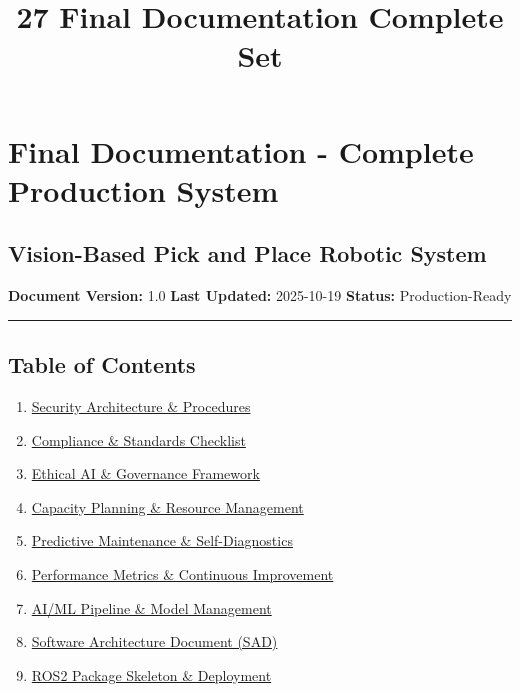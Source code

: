 \documentclass[
]{article}
\title{27 Final Documentation Complete Set}
\author{}
\date{}
\providecommand{\tightlist}{%
  \setlength{\itemsep}{0pt}\setlength{\parskip}{0pt}}
\begin{document}
\maketitle

{
\setcounter{tocdepth}{3}
\tableofcontents
}
\hypertarget{final-documentation---complete-production-system}{%
\section{Final Documentation - Complete Production
System}\label{final-documentation---complete-production-system}}

\hypertarget{vision-based-pick-and-place-robotic-system}{%
\subsection{Vision-Based Pick and Place Robotic
System}\label{vision-based-pick-and-place-robotic-system}}

\textbf{Document Version:} 1.0 \textbf{Last Updated:} 2025-10-19
\textbf{Status:} Production-Ready

\begin{center}\rule{0.5\linewidth}{0.5pt}\end{center}

\hypertarget{table-of-contents}{%
\subsection{Table of Contents}\label{table-of-contents}}

\begin{enumerate}
\def\labelenumi{\arabic{enumi}.}
\tightlist
\item
  \protect\hyperlink{security-architecture--procedures}{Security
  Architecture \& Procedures}
\item
  \protect\hyperlink{compliance--standards-checklist}{Compliance \&
  Standards Checklist}
\item
  \protect\hyperlink{ethical-ai--governance-framework}{Ethical AI \&
  Governance Framework}
\item
  \protect\hyperlink{capacity-planning--resource-management}{Capacity
  Planning \& Resource Management}
\item
  \protect\hyperlink{predictive-maintenance--self-diagnostics}{Predictive
  Maintenance \& Self-Diagnostics}
\item
  \protect\hyperlink{performance-metrics--continuous-improvement}{Performance
  Metrics \& Continuous Improvement}
\item
  \protect\hyperlink{aiml-pipeline--model-management}{AI/ML Pipeline \&
  Model Management}
\item
  \protect\hyperlink{software-architecture-document-sad}{Software
  Architecture Document (SAD)}
\item
  \protect\hyperlink{ros2-package-skeleton--deployment}{ROS2 Package
  Skeleton \& Deployment}
\end{enumerate}
\end{document}
